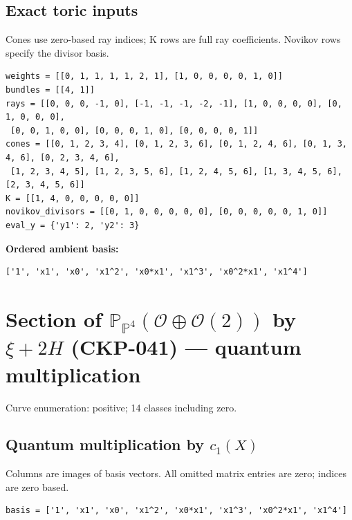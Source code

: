 \documentclass[10pt,a4paper]{article}
\begin{document}
\subsection*{Exact toric inputs}
Cones use zero-based ray indices; K rows are full ray coefficients. Novikov rows specify the divisor basis.

\begin{lstlisting}
weights = [[0, 1, 1, 1, 1, 2, 1], [1, 0, 0, 0, 0, 1, 0]]
bundles = [[4, 1]]
rays = [[0, 0, 0, -1, 0], [-1, -1, -1, -2, -1], [1, 0, 0, 0, 0], [0, 1, 0, 0, 0],
 [0, 0, 1, 0, 0], [0, 0, 0, 1, 0], [0, 0, 0, 0, 1]]
cones = [[0, 1, 2, 3, 4], [0, 1, 2, 3, 6], [0, 1, 2, 4, 6], [0, 1, 3, 4, 6], [0, 2, 3, 4, 6],
 [1, 2, 3, 4, 5], [1, 2, 3, 5, 6], [1, 2, 4, 5, 6], [1, 3, 4, 5, 6], [2, 3, 4, 5, 6]]
K = [[1, 4, 0, 0, 0, 0, 0]]
novikov_divisors = [[0, 1, 0, 0, 0, 0, 0], [0, 0, 0, 0, 0, 1, 0]]
eval_y = {'y1': 2, 'y2': 3}
\end{lstlisting}

\textbf{Ordered ambient basis:}
\begin{lstlisting}
['1', 'x1', 'x0', 'x1^2', 'x0*x1', 'x1^3', 'x0^2*x1', 'x1^4']
\end{lstlisting}

\clearpage\section*{Section of $\mathbb P_{\mathbb P^{4}}(\mathcal O\oplus \mathcal O(2))$ by $\xi +2H$ (CKP-041) --- quantum multiplication}

Curve enumeration: positive; 14 classes including zero.
\subsection*{Quantum multiplication by $c_1(X)$}
Columns are images of basis vectors. All omitted matrix entries are zero; indices are zero based.

\begin{lstlisting}
basis = ['1', 'x1', 'x0', 'x1^2', 'x0*x1', 'x1^3', 'x0^2*x1', 'x1^4']
\end{lstlisting}
\end{document}
